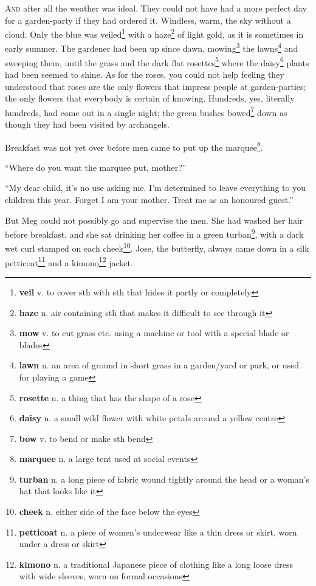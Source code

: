 \lettrine{A}{nd} after all the weather was ideal. They could not have had a more perfect day for a garden-party if they had ordered it. Windless, warm, the sky without a cloud. Only the blue was veiled\footnote{\textbf{veil} v. to cover sth with sth that hides it partly or completely} with a haze\footnote{\textbf{haze} n. air containing sth that makes it difficult to see through it} of light gold, as it is sometimes in early summer. The gardener had been up since dawn, mowing\footnote{\textbf{mow} v. to cut grass etc. using a machine or tool with a special blade or blades} the lawns\footnote{\textbf{lawn} n. an area of ground in short grass in a garden/yard or park, or used for playing a game} and sweeping them, until the grass and the dark flat rosettes\footnote{\textbf{rosette} n. a thing that has the shape of a rose} where the daisy\footnote{\textbf{daisy} n. a small wild flower with white petals around a yellow centre} plants had been seemed to shine. As for the roses, you could not help feeling they understood that roses are the only flowers that impress people at garden-parties; the only flowers that everybody is certain of knowing. Hundreds, yes, literally hundreds, had come out in a single night; the green bushes bowed\footnote{\textbf{bow} v. to bend or make sth bend} down as though they had been visited by archangels.

Breakfast was not yet over before men came to put up the marquee\footnote{\textbf{marquee} n. a large tent used at social events}.

``Where do you want the marquee put, mother?''

``My dear child, it's no use asking me. I'm determined to leave everything to you children this year. Forget I am your mother. Treat me as an honoured guest.''

But Meg could not possibly go and supervise the men. She had washed her hair before breakfast, and she sat drinking her coffee in a green turban\footnote{\textbf{turban} n. a long piece of fabric wound tightly around the head or a woman's hat that looks like it}, with a dark wet curl stamped on each cheek\footnote{\textbf{cheek} n. either side of the face below the eyes}. Jose, the butterfly, always came down in a silk petticoat\footnote{\textbf{petticoat} n. a piece of women's underwear like a thin dress or skirt, worn under a dress or skirt} and a kimono\footnote{\textbf{kimono} n. a traditional Japanese piece of clothing like a long loose dress with wide sleeves, worn on formal occasions} jacket.

